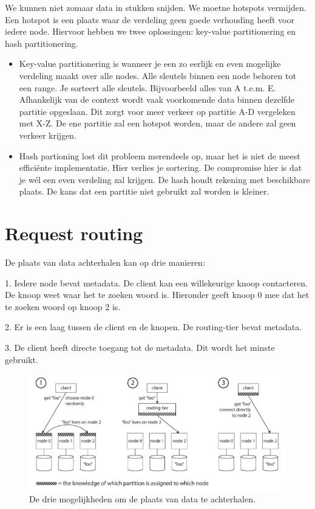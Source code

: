 \documentclass[a4paper,10pt,twoside]{report}
\begin{document}
We kunnen niet zomaar data in stukken snijden. We moetne hotspots vermijden. Een hotspot is een plaats waar de verdeling geen goede verhouding heeft voor iedere node. Hiervoor hebben we twee oplossingen: key-value partitionering en hash partitionering.

\begin{itemize}
	\item Key-value partitionering is wanneer je een zo eerlijk en even mogelijke verdeling maakt over alle nodes. Alle sleutels binnen een node behoren tot een range. Je sorteert alle sleutels. Bijvoorbeeld alles van A t.e.m. E. Afhankelijk van de context wordt vaak voorkomende data binnen dezelfde partitie opgeslaan. Dit zorgt voor meer verkeer op partitie A-D vergeleken met X-Z. De ene partitie zal een hotspot worden, maar de andere zal geen verkeer krijgen.
	\item Hash partioning lost dit probleem merendeels op, maar het is niet de meest efficiënte implementatie. Hier verlies je sortering. De compromise hier is dat je wél een even verdeling zal krijgen. De hash houdt rekening met beschikbare plaats. De kans dat een partitie niet gebruikt zal worden is kleiner. 
\end{itemize}


\section{Request routing}

De plaats van data achterhalen kan op drie manieren:

1. Iedere node bevat metadata. De client kan een willekeurige knoop contacteren. De knoop weet waar het te zoeken woord is. Hieronder geeft knoop 0 mee dat het te zoeken woord op knoop 2 is.

2. Er is een laag tussen de client en de knopen. De routing-tier bevat metadata.

3. De client heeft directe toegang tot de metadata. Dit wordt het minste gebruikt.

\begin{figure}
	\includegraphics[width=\linewidth]{../images/Screenshot_216.png}
	\caption{De drie mogelijkheden om de plaats van data te achterhalen.}
\end{figure}
\end{document}
